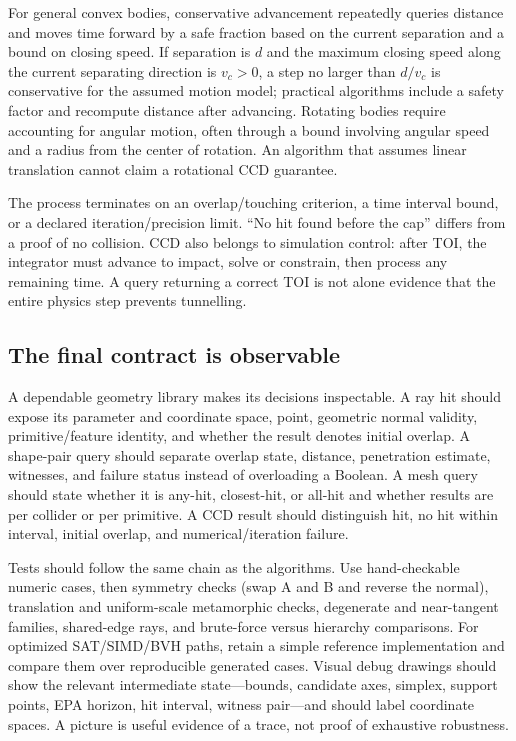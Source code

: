 For general convex bodies, conservative advancement repeatedly queries distance and moves time forward by a safe fraction based on the current separation and a bound on closing speed. If separation is \(d\) and the maximum closing speed along the current separating direction is \(v_c>0\), a step no larger than \(d/v_c\) is conservative for the assumed motion model; practical algorithms include a safety factor and recompute distance after advancing. Rotating bodies require accounting for angular motion, often through a bound involving angular speed and a radius from the center of rotation. An algorithm that assumes linear translation cannot claim a rotational CCD guarantee.

The process terminates on an overlap/touching criterion, a time interval bound, or a declared iteration/precision limit. ``No hit found before the cap'' differs from a proof of no collision. CCD also belongs to simulation control: after TOI, the integrator must advance to impact, solve or constrain, then process any remaining time. A query returning a correct TOI is not alone evidence that the entire physics step prevents tunnelling.

\subsection{The final contract is observable}\label{03-visual-computing-i-ch020-the-final-contract-is-observable}

\hypertarget{03-visual-computing-i-ch020-the-final-contract-is-observable}{}

A dependable geometry library makes its decisions inspectable. A ray hit should expose its parameter and coordinate space, point, geometric normal validity, primitive/feature identity, and whether the result denotes initial overlap. A shape-pair query should separate overlap state, distance, penetration estimate, witnesses, and failure status instead of overloading a Boolean. A mesh query should state whether it is any-hit, closest-hit, or all-hit and whether results are per collider or per primitive. A CCD result should distinguish hit, no hit within interval, initial overlap, and numerical/iteration failure.

Tests should follow the same chain as the algorithms. Use hand-checkable numeric cases, then symmetry checks (swap A and B and reverse the normal), translation and uniform-scale metamorphic checks, degenerate and near-tangent families, shared-edge rays, and brute-force versus hierarchy comparisons. For optimized SAT/SIMD/BVH paths, retain a simple reference implementation and compare them over reproducible generated cases. Visual debug drawings should show the relevant intermediate state---bounds, candidate axes, simplex, support points, EPA horizon, hit interval, witness pair---and should label coordinate spaces. A picture is useful evidence of a trace, not proof of exhaustive robustness.

